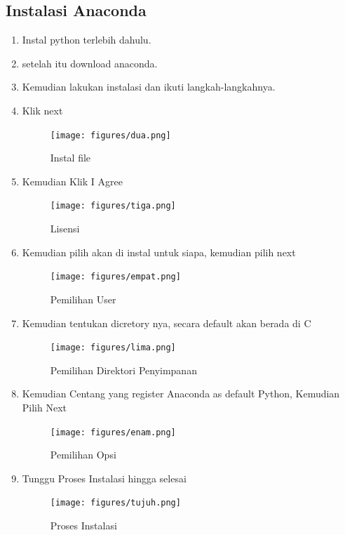 \subsection{Instalasi Anaconda}
\begin{enumerate}
    \item Instal python terlebih dahulu.
    \item setelah itu download anaconda.
    \item Kemudian lakukan instalasi dan ikuti langkah-langkahnya.
    \item Klik next
    \begin{figure}[!htbp]
        \centering
        \texttt{[image: figures/dua.png]}
        \caption{Instal file}
        \label{awal}
        \end{figure}

    \item Kemudian Klik I Agree
    \begin{figure}[!htbp]
        \centering
        \texttt{[image: figures/tiga.png]}
        \caption{Lisensi}
        \label{License}
        \end{figure}

    \item Kemudian pilih akan di instal untuk siapa, kemudian pilih next
    \begin{figure}[!htbp]
        \centering
        \texttt{[image: figures/empat.png]}
        \caption{Pemilihan User}
        \label{User}
        \end{figure}

    \item Kemudian tentukan dicretory nya, secara default akan berada di C
    \begin{figure}[!htbp]
        \centering
        \texttt{[image: figures/lima.png]}
        \caption{Pemilihan Direktori Penyimpanan}
        \label{Directory}
        \end{figure}

    \item Kemudian Centang yang register Anaconda as default Python, Kemudian Pilih Next
    \begin{figure}[!htbp]
        \centering
        \texttt{[image: figures/enam.png]}
        \caption{Pemilihan Opsi}
        \label{opsi}
        \end{figure}

    \item Tunggu Proses Instalasi hingga selesai
    \begin{figure}[!htbp]
        \centering
        \texttt{[image: figures/tujuh.png]}
        \caption{Proses Instalasi}
        \label{Proses}
        \end{figure}


\end{enumerate}
